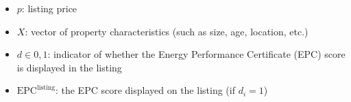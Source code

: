 \begin{itemize}
\item $p$: listing price
\item $X$: vector of property characteristics (such as size, age, location, etc.)
\item $d \in {0,1}$: indicator of whether the Energy Performance Certificate (EPC) score is displayed in the listing
\item $\text{EPC}^{\text{listing}}$: the EPC score displayed on the listing (if $d_i = 1$)
\end{itemize}
